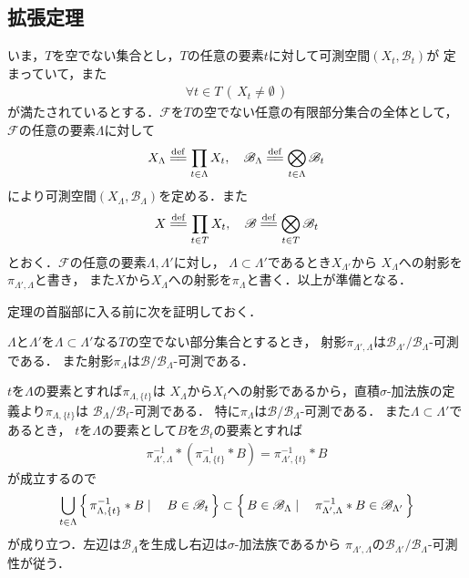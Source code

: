 \subsection{拡張定理}
	いま，$T$を空でない集合とし，$T$の任意の要素$t$に対して可測空間$(X_t,\mathscr{B}_t)$が
	定まっていて，また
	\begin{align}
		\forall t \in T\, (\, X_t \neq \emptyset\, )
	\end{align}
	が満たされているとする．$\mathscr{F}$を$T$の空でない任意の有限部分集合の全体として，$\mathscr{F}$の任意の要素$\Lambda$に対して
	\begin{align}
		X_\Lambda \defeq \prod_{t \in \Lambda} X_t,
		\quad \mathscr{B}_\Lambda \defeq \bigotimes_{t \in \Lambda} \mathscr{B}_t
	\end{align}
	により可測空間$(X_\Lambda,\mathscr{B}_\Lambda)$を定める．また
	\begin{align}
		X \defeq \prod_{t \in T} X_t,
		\quad \mathscr{B} \defeq \bigotimes_{t \in T} \mathscr{B}_t
	\end{align}
	とおく．$\mathscr{F}$の任意の要素$\Lambda,\Lambda'$に対し，
	$\Lambda \subset \Lambda'$であるとき$X_{\Lambda'}$から
	$X_{\Lambda}$への射影を$\pi_{\Lambda',\Lambda}$と書き，
	また$X$から$X_\Lambda$への射影を$\pi_{\Lambda}$と書く．以上が準備となる．
	
	定理の首脳部に入る前に次を証明しておく．
	\begin{screen}
		\begin{lem}[射影の可測性]\label{lem:Kolmogorov_extension_theorem}
			$\Lambda$と$\Lambda'$を$\Lambda \subset \Lambda'$なる$T$の空でない部分集合とするとき，
			射影$\pi_{\Lambda',\Lambda}$は$\mathscr{B}_{\Lambda'}/\mathscr{B}_\Lambda$-可測である．
			また射影$\pi_\Lambda$は$\mathscr{B}/\mathscr{B}_\Lambda$-可測である．
		\end{lem}
	\end{screen}
	
	\begin{prf}
		$t$を$\Lambda$の要素とすれば$\pi_{\Lambda,\{t\}}$は
		$X_\Lambda$から$X_t$への射影であるから，直積$\sigma$-加法族の定義より$\pi_{\Lambda,\{t\}}$は
		$\mathscr{B}_\Lambda/\mathscr{B}_t$-可測である．
		特に$\pi_\Lambda$は$\mathscr{B}/\mathscr{B}_\Lambda$-可測である．
		また$\Lambda \subset \Lambda'$であるとき，
		$t$を$\Lambda$の要素として$B$を$\mathscr{B}_t$の要素とすれば
		\begin{align}
			\pi_{\Lambda',\Lambda}^{-1} \ast \left(\pi_{\Lambda,\{t\}}^{-1} \ast B\right)
			= \pi_{\Lambda',\{t\}}^{-1} \ast B
		\end{align}
		が成立するので
		\begin{align}
			\bigcup_{t\in\Lambda} \left\{\, \pi_{\Lambda,\{t\}}^{-1} \ast B \mid \quad B \in \mathscr{B}_t\, \right\}
			\subset \left\{\, B \in \mathscr{B}_\Lambda \mid \quad \pi_{\Lambda',\Lambda}^{-1} \ast B \in \mathscr{B}_{\Lambda'}\, \right\}
		\end{align}
		が成り立つ．左辺は$\mathscr{B}_\Lambda$を生成し右辺は$\sigma$-加法族であるから
		$\pi_{\Lambda',\Lambda}$の$\mathscr{B}_{\Lambda'}/\mathscr{B}_\Lambda$-可測性が従う．
		\QED
	\end{prf}
	
